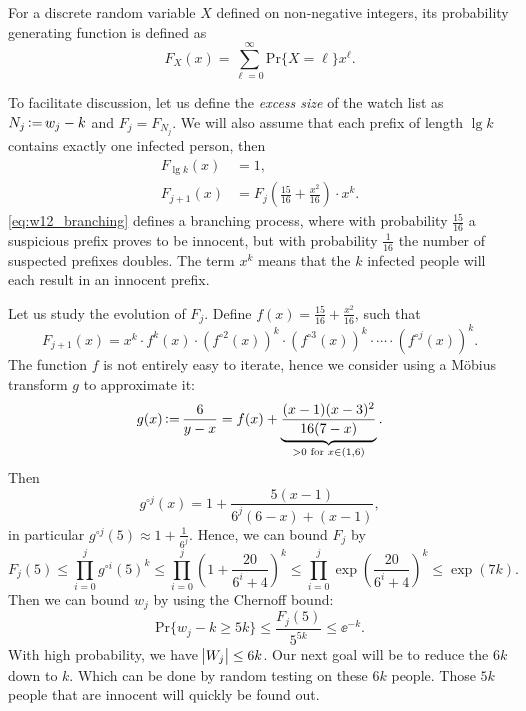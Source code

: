 \begin{definition}
    For a discrete random variable $X$ defined on non-negative integers, its probability generating function is defined as
    \begin{equation}
        F_X(x) = \sum_{\ell=0}^{\infty} \mathrm{Pr}\{X=\ell\} x^\ell.
    \end{equation}
\end{definition}
To facilitate discussion, let us define the \textit{excess size} of the watch list as $N_j \operatorname{\vcentcolon=} w_j-k$ and $F_j = F_{N_j}$. We will also assume that each prefix of length $\lg k$ contains exactly one infected person, then
\begin{align}
    F_{\lg k}(x) &= 1, \\
    F_{j+1}(x) &= F_{j}\left(\frac{15}{16} + \frac{x^2}{16}\right) \cdot x^k. \label{eq:w12_branching}
\end{align}
\autoref{eq:w12_branching} defines a branching process, where with probability $\frac{15}{16}$ a suspicious prefix proves to be innocent, but with probability $\frac{1}{16}$ the number of suspected prefixes doubles. The term $x^k$ means that the $k$ infected people will each result in an innocent prefix.

Let us study the evolution of $F_j$. Define $f(x) = \frac{15}{16} + \frac{x^2}{16}$, such that
\begin{equation}
    F_{j+1}(x) = x^k \cdot f^k(x) \cdot \left(f^{\circ2}(x)\right)^k \cdot \left(f^{\circ3}(x)\right)^k \cdot \cdots \cdot \left(f^{\circ j}(x)\right)^k.
\end{equation}
The function $f$ is not entirely easy to iterate, hence we consider using a M\"obius transform $g$ to approximate it:
\begin{equation}
    g(x) \operatorname{\vcentcolon=} \frac{6}{y-x} = f(x) + \underbrace{\frac{(x-1)(x-3)^2}{16(7-x)}}_{>0 \text{ for }x\in(1,6)}.
\end{equation}
Then
\begin{equation}
    g^{\circ j}(x) = 1 + \frac{5(x-1)}{6^j(6-x) + (x-1)},
\end{equation}
in particular $g^{\circ j}(5) \approx 1 + \frac{1}{6^j}$. Hence, we can bound $F_j$ by
\begin{equation*}
    F_j(5) \le \prod_{i=0}^{j} g^{\circ i}(5)^k \le \prod_{i=0}^{j} \left(1 + \frac{20}{6^i+4}\right)^k \le \prod_{i=0}^{j}\exp\left(\frac{20}{6^i+4}\right)^k \le \exp(7k).
\end{equation*}
Then we can bound $w_j$ by using the Chernoff bound:
\begin{equation*}
    \mathrm{Pr}\{w_j-k \ge 5k\} \le \frac{F_j(5)}{5^{5k}} \le \ee^{-k}.
\end{equation*}
With high probability, we have $\abs{W_j}\le 6k$. Our next goal will be to reduce the $6k$ down to $k$. Which can be done by random testing on these $6k$ people. Those $5k$ people that are innocent will quickly be found out.

